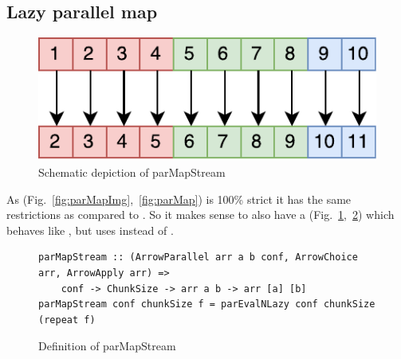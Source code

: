 \subsection{Lazy parallel map}
\begin{figure}[h]
	\includegraphics[scale=0.7]{images/parMapStream}
	\caption{Schematic depiction of parMapStream}
	\label{fig:parMapStreamImg}
\end{figure}
As  (Fig.~\ref{fig:parMapImg},~\ref{fig:parMap}) is 100\% strict it has the same restrictions as  compared to . So it makes sense to also have a  (Fig.~\ref{fig:parMapStreamImg},~\ref{fig:parMapStream}) which behaves like , but uses  instead of .
\begin{figure}[h]
\begin{lstlisting}[frame=htrbl]
parMapStream :: (ArrowParallel arr a b conf, ArrowChoice arr, ArrowApply arr) =>
	conf -> ChunkSize -> arr a b -> arr [a] [b]
parMapStream conf chunkSize f = parEvalNLazy conf chunkSize (repeat f)
\end{lstlisting}
\caption{Definition of parMapStream}
\label{fig:parMapStream}
\end{figure}

